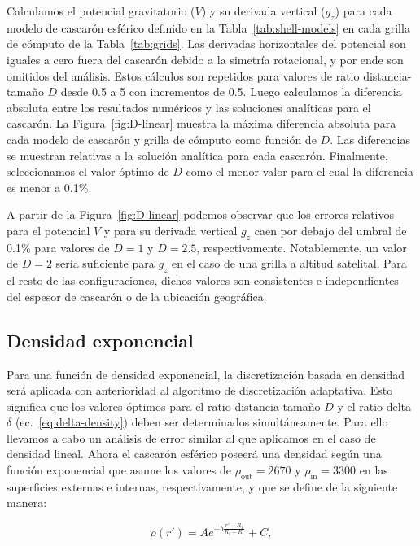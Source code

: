 Calculamos el potencial gravitatorio ($V$) y su derivada vertical ($g_z$)
para cada modelo de cascarón esférico definido en la
Tabla~\ref{tab:shell-models} en cada grilla de cómputo de la
Tabla~\ref{tab:grids}.
Las derivadas horizontales del potencial son iguales a cero fuera del cascarón
debido a la simetría rotacional, y por ende son omitidos del análisis.
Estos cálculos son repetidos para valores de ratio distancia-tamaño $D$ desde
0.5 a 5 con incrementos de 0.5.
Luego calculamos la diferencia absoluta entre los resultados numéricos y las
soluciones analíticas para el cascarón.
La Figura~\ref{fig:D-linear} muestra la máxima diferencia absoluta para cada
modelo de cascarón y grilla de cómputo como función de $D$.
Las diferencias se muestran relativas a la solución analítica para cada
cascarón.
Finalmente, seleccionamos el valor óptimo de $D$ como el menor valor para el
cual la diferencia es menor a 0.1\%.

A partir de la Figura~\ref{fig:D-linear} podemos observar que los errores
relativos para el potencial $V$ y para su derivada vertical $g_z$ caen por
debajo del umbral de 0.1\% para valores de $D=1$ y $D=2.5$, respectivamente.
Notablemente, un valor de $D=2$ sería suficiente para $g_z$ en el caso de una
grilla a altitud satelital.
Para el resto de las configuraciones, dichos valores son consistentes
e independientes del espesor de cascarón o de la ubicación geográfica.


\subsection{Densidad exponencial}

Para una función de densidad exponencial, la discretización basada en densidad
será aplicada con anterioridad al algoritmo de discretización adaptativa.
Esto significa que los valores óptimos para el ratio distancia-tamaño $D$ y el
ratio delta $\delta$ (ec.~\ref{eq:delta-density}) deben ser determinados
simultáneamente.
Para ello llevamos a cabo un análisis de error similar al que aplicamos en el
caso de densidad lineal.
Ahora el cascarón esférico poseerá una densidad según una función exponencial
que asume los valores de $\rho_\text{out} = 2670$\kgpercubicm{}
y $\rho_\text{in} = 3300$\kgpercubicm{} en las superficies externas
e internas, respectivamente, y que se define de la siguiente manera:

\begin{equation}
    \rho(r') = A e^{- b \frac{r' - R_1}{R_2 - R_1}} + C,
    \label{eq:density-exp}
\end{equation}

